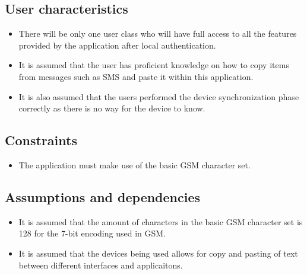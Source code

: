 \subsection{User characteristics}
\begin{itemize}
\item There will be only one user class who will have full access to all the features provided by the application after local authentication.
\item It is assumed that the user has proficient knowledge on how to copy items from messages such as SMS and paste it within this application.
\item It is also assumed that the users performed the device synchronization phase correctly as there is no way for the device to know.
\end{itemize}


\subsection{Constraints}
\begin{itemize}
\item The application must make use of the basic GSM character set.
\end{itemize}



\subsection{Assumptions and dependencies}

\begin{itemize}
\item It is assumed that the amount of characters in the basic GSM character set is 128 for the 7-bit encoding used in GSM.
\item It is assumed that the devices being used allows for copy and pasting of text between different interfaces and applicaitons.
\end{itemize}
